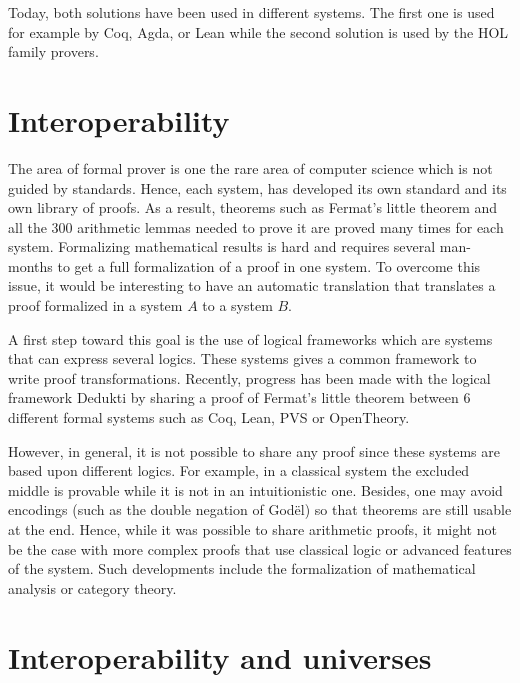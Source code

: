 \documentclass{article}
\begin{document}
Today, both solutions have been used in different systems. The first one is used for example by Coq, Agda, or Lean while the second solution is used by the HOL family provers.

\section{Interoperability}

The area of formal prover is one the rare area of computer science which is not guided by standards. Hence, each system, has developed its own standard and its own library of proofs. As a result, theorems such as Fermat's little theorem and all the \(300\) arithmetic lemmas needed to prove it are proved many times for each system. Formalizing mathematical results is hard and requires several man-months to get a full formalization of a proof in one system. To overcome this issue, it would be interesting to have an automatic translation that translates a proof formalized in a system \(A\) to a system \(B\).

A first step toward this goal is the use of logical frameworks which are systems that can express several logics. These systems gives a common framework to write proof transformations. Recently, progress has been made with the logical framework Dedukti by sharing a proof of Fermat's little theorem between \(6\) different formal systems such as Coq, Lean, PVS or OpenTheory.

However, in general, it is not possible to share any proof since these systems are based upon different logics. For example, in a classical system the excluded middle is provable while it is not in an intuitionistic one. Besides, one may avoid encodings (such as the double negation of Godël) so that theorems are still usable at the end. Hence, while it was possible to share arithmetic proofs, it might not be the case with more complex proofs that use classical logic or advanced features of the system. Such developments include the formalization of mathematical analysis or category theory.

\section{Interoperability and universes}
\end{document}
